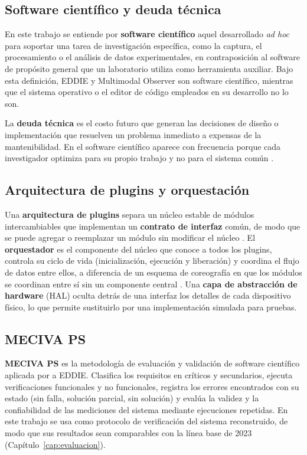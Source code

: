 \subsection{Software científico y deuda técnica}

En este trabajo se entiende por \textbf{software científico} aquel desarrollado \textit{ad hoc} para soportar una tarea de investigación específica, como la captura, el procesamiento o el análisis de datos experimentales, en contraposición al software de propósito general que un laboratorio utiliza como herramienta auxiliar. Bajo esta definición, EDDIE y Multimodal Observer son software científico, mientras que el sistema operativo o el editor de código empleados en su desarrollo no lo son.

La \textbf{deuda técnica} es el costo futuro que generan las decisiones de diseño o implementación que resuelven un problema inmediato a expensas de la mantenibilidad. En el software científico aparece con frecuencia porque cada investigador optimiza para su propio trabajo y no para el sistema común \citep{ernst2026}.

\subsection{Arquitectura de plugins y orquestación}

Una \textbf{arquitectura de plugins} separa un núcleo estable de módulos intercambiables que implementan un \textbf{contrato de interfaz} común, de modo que se puede agregar o reemplazar un módulo sin modificar el núcleo \citep{bustio2013}. El \textbf{orquestador} es el componente del núcleo que conoce a todos los plugins, controla su ciclo de vida (inicialización, ejecución y liberación) y coordina el flujo de datos entre ellos, a diferencia de un esquema de coreografía en que los módulos se coordinan entre sí sin un componente central \citep{megargel2021}. Una \textbf{capa de abstracción de hardware} (HAL) oculta detrás de una interfaz los detalles de cada dispositivo físico, lo que permite sustituirlo por una implementación simulada para pruebas.

\subsection{MECIVA PS}

\textbf{MECIVA PS} es la metodología de evaluación y validación de software científico aplicada por \citet{ibaceta2023} a EDDIE. Clasifica los requisitos en críticos y secundarios, ejecuta verificaciones funcionales y no funcionales, registra los errores encontrados con su estado (sin falla, solución parcial, sin solución) y evalúa la validez y la confiabilidad de las mediciones del sistema mediante ejecuciones repetidas. En este trabajo se usa como protocolo de verificación del sistema reconstruido, de modo que sus resultados sean comparables con la línea base de 2023 (Capítulo~\ref{cap:evaluacion}).

